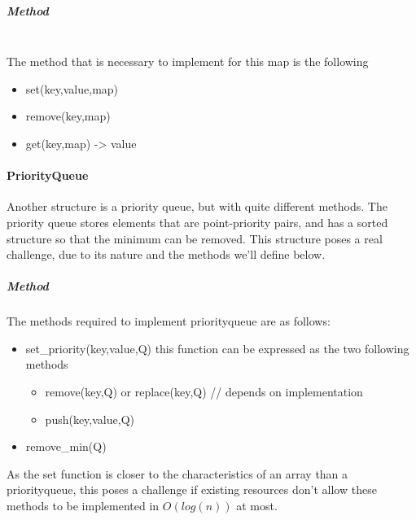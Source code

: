\subparagraph{Method}
\\
The method that is necessary to implement for this map is the following

\begin{itemize}
    \item set(key,value,map)
    \item remove(key,map)
    \item get(key,map) -> value
\end{itemize}


\paragraph{PriorityQueue}
Another structure is a priority queue, but with quite different methods.
The priority queue stores elements that are point-priority pairs, and has a sorted structure so that the minimum can be removed. This structure poses a real challenge, due to its nature and the methods we'll define below.


\subparagraph{Method}
The methods required to implement priorityqueue are as follows:
\begin{itemize}
    \item set\_priority(key,value,Q) this function can be expressed as the two following methods
    \begin{itemize}
        \item remove(key,Q) or replace(key,Q) // depends on implementation
        \item push(key,value,Q)
    \end{itemize}
    \item remove\_min(Q)
\end{itemize}

As the set function is closer to the characteristics of an array than a priorityqueue, this poses a challenge if existing resources don't allow these methods to be implemented in $O(log(n))$ at most.



